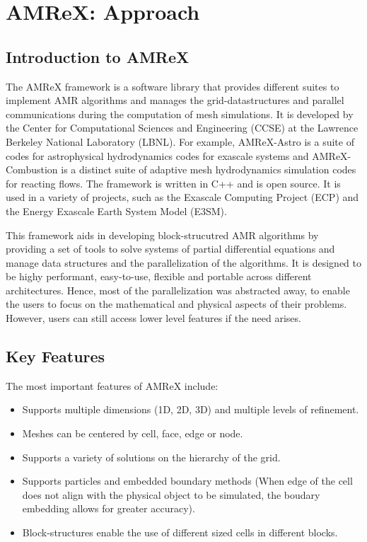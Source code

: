 \documentclass[12pt, a4paper]{scrartcl}
\begin{document}
\section{AMReX: Approach}
\subsection{Introduction to AMReX}

The AMReX framework is a software library that provides different suites to implement AMR algorithms and manages the 
grid-datastructures and parallel communications during the computation of mesh simulations. 
It is developed by the Center for Computational Sciences and 
Engineering (CCSE) at the Lawrence Berkeley National Laboratory (LBNL).
For example, AMReX-Astro is a suite of codes for astrophysical hydrodynamics codes for exascale systems and AMReX-
Combustion is a distinct suite of adaptive mesh hydrodynamics simulation codes for reacting flows.
The framework is written in C++ and is open source. It is used in a variety of projects, such as the
Exascale Computing Project (ECP) and the Energy Exascale Earth System Model (E3SM).

This framework aids in developing block-strucutred AMR algorithms by providing a set of tools to
solve systems of partial differential equations and manage data structures and the parallelization of the algorithms.
It is designed to be highy performant, easy-to-use, flexible and portable across different architectures.
Hence, most of the parallelization was abstracted away, to enable the users to focus on the mathematical and physical
aspects of their problems. However, users can still access lower level features if the need arises.

\subsection{Key Features}

The most important features of AMReX include:

\begin{itemize}
    \item Supports multiple dimensions (1D, 2D, 3D) and multiple levels of refinement.
    \item Meshes can be centered by cell, face, edge or node.
    \item Supports a variety of solutions on the hierarchy of the grid.
    \item Supports particles and embedded boundary methods (When edge of the cell does not align with the physical object to be simulated, the boudary embedding allows for greater accuracy).
    \item Block-structures enable the use of different sized cells in different blocks.
\end{itemize}
\end{document}
